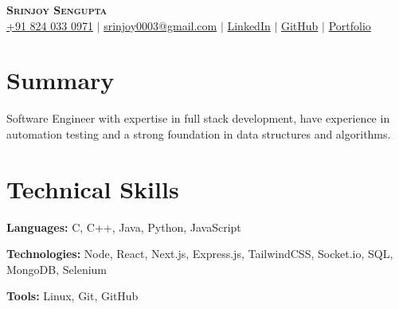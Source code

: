 \documentclass[letterpaper,11pt]{article}
\newcommand{\resumeSubHeadingListStart}{\begin{itemize}[leftmargin=0.15in, label={}]}
\newcommand{\resumeSubHeadingListEnd}{\end{itemize}}
\begin{document}

\begin{center}
    \textbf{\Huge \scshape Srinjoy Sengupta} \\ \vspace{3pt}
    \small
    \faMobile \hspace{.5pt} \href{tel:918240330971}{+91 824 033 0971}
    $|$
    \faAt \hspace{.5pt} \href{srinjoy003@gmail.com}{srinjoy0003@gmail.com}
    $|$
    \faLinkedinSquare \hspace{.5pt} \href{https://linkedin.com/in/srinjoy-sengupta-b28565302}{LinkedIn}
    $|$
    \faGithub \hspace{.5pt} \href{https://github.com/Srinjoy003}{GitHub}
    $|$
    \faGlobe \hspace{.5pt} \href{https://srinjoysengupta.vercel.app/}{Portfolio}
\end{center}


\section{Summary}
  \vspace{2pt}
  \small{
  Software Engineer with expertise in full stack development, have experience in automation testing and a strong foundation in data structures and algorithms.
  }




\section{Technical Skills}
  \vspace{2pt}
  \resumeSubHeadingListStart
    \small{\item{
        
        \textbf{Languages:}{ C, C++, Java, Python, JavaScript} \\ \vspace{3pt}
        
        \textbf{Technologies:}{ Node, React, Next.js, Express.js, TailwindCSS, Socket.io, SQL, MongoDB, Selenium } \\ \vspace{3pt}
        
        \textbf{Tools:}{ Linux, Git, GitHub} \\ \vspace{3pt}
        
    }}
  \resumeSubHeadingListEnd
\end{document}
